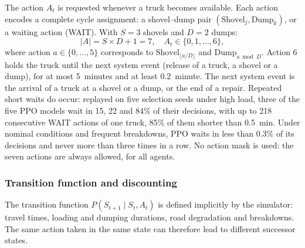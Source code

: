 \documentclass[11pt,a4paper]{article}
\newif\ifrevmarks
\newcommand{\revtag}[1]{\ifrevmarks\textsuperscript{\textcolor{red!70!black}{\scriptsize[#1]}}\fi}
\newcommand{\rev}[2]{\ifrevmarks{\color{revcolor}#2}\revtag{#1}\else#2\fi}
\newif\ifcorrmarks
\newcommand{\corr}[1]{\ifcorrmarks\textcolor{corrcolor}{#1}\else#1\fi}
\begin{document}
The action $A_t$ is requested whenever a truck becomes available. Each action encodes a complete cycle assignment: a shovel--dump pair $(\text{Shovel}_j, \text{Dump}_k)$, or a waiting action (WAIT). With $S=3$ shovels and $D=2$ dumps:
\begin{equation}
  |A| = S \times D + 1 = 7,
  \quad A_t \in \{0, 1, \dots, 6\},
\end{equation}
where action $a \in \{0,\dots,5\}$ corresponds to $\text{Shovel}_{\lfloor a/D \rfloor}$ and $\text{Dump}_{a \bmod D}$. \rev{M11}{Action 6 holds the truck until the next system event (release of a truck, a shovel or a dump), for at most 5~minutes and at least 0.2~minute.} \corr{The next system event is the arrival of a truck at a shovel or a dump, or the end of a repair. Repeated short waits do occur: replayed on five selection seeds under high load, three of the five PPO models wait in 15, 22 and 84\% of their decisions, with up to 218 consecutive WAIT actions of one truck, 85\% of them shorter than 0.5~min. Under nominal conditions and frequent breakdowns, PPO waits in less than 0.3\% of its decisions and never more than three times in a row.} \rev{M16, v3}{No action mask is used: the seven actions are always allowed, for all agents.}

\subsubsection{Transition function and discounting}
\label{sec:discount}

The transition function $P(S_{t+1} \mid S_t, A_t)$ is defined implicitly by the simulator: travel times, loading and dumping durations, road degradation and breakdowns. The same action taken in the same state can therefore lead to different successor states.
\end{document}
